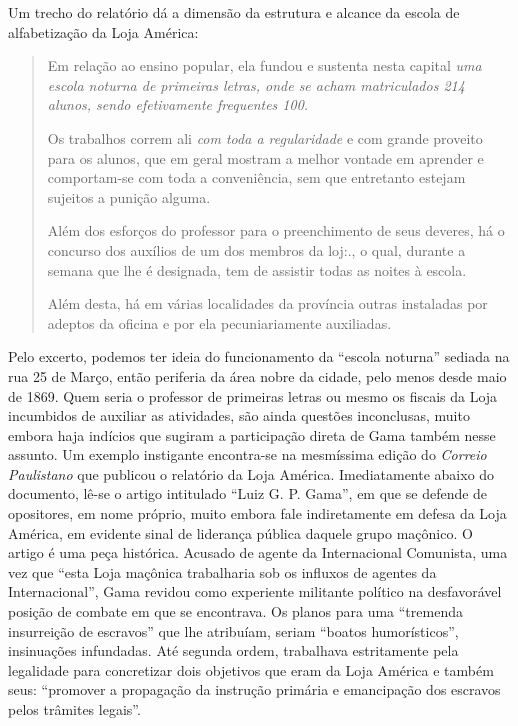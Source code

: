 Um trecho do relatório dá a dimensão da estrutura e alcance da escola de
alfabetização da Loja América:

\begin{quote}
Em relação ao ensino popular, ela fundou e sustenta nesta capital
\textit{uma escola noturna de primeiras letras, onde se acham
matriculados 214 alunos, sendo efetivamente frequentes 100.}

Os trabalhos correm ali \textit{com toda a regularidade} e com grande
proveito para os alunos, que em geral mostram a melhor vontade em
aprender e comportam-se com toda a conveniência, sem que entretanto
estejam sujeitos a punição alguma.

Além dos esforços do professor para o preenchimento de seus deveres, há
o concurso dos auxílios de um dos membros da loj:., o qual, durante a
semana que lhe é designada, tem de assistir todas as noites à escola.

Além desta, há em várias localidades da província outras instaladas por
adeptos da oficina e por ela pecuniariamente auxiliadas.
\end{quote}

Pelo excerto, podemos ter ideia do funcionamento da ``escola noturna''
sediada na rua 25 de Março, então periferia da área nobre da cidade,
pelo menos desde maio de 1869. Quem seria o professor de primeiras
letras ou mesmo os fiscais da Loja incumbidos de auxiliar as atividades,
são ainda questões inconclusas, muito embora haja indícios que sugiram a
participação direta de Gama também nesse assunto. Um exemplo instigante
encontra-se na mesmíssima edição do \emph{Correio Paulistano} que
publicou o relatório da Loja América. Imediatamente abaixo do documento,
lê-se o artigo intitulado ``Luiz G. P. Gama'', em que se defende de
opositores, em nome próprio, muito embora fale indiretamente em defesa
da Loja América, em evidente sinal de liderança pública daquele grupo
maçônico. O artigo é uma peça histórica. Acusado de agente da
Internacional Comunista, uma vez que ``esta Loja maçônica
trabalharia sob os influxos de agentes da Internacional'', Gama
revidou como experiente militante político na desfavorável posição de
combate em que se encontrava. Os planos para uma ``tremenda insurreição
de escravos'' que lhe atribuíam, seriam ``boatos humorísticos'',
insinuações infundadas. Até segunda ordem, trabalhava estritamente pela
legalidade para concretizar dois objetivos que eram da Loja América e
também seus: ``promover a propagação da instrução primária e emancipação
dos escravos pelos trâmites legais''.


